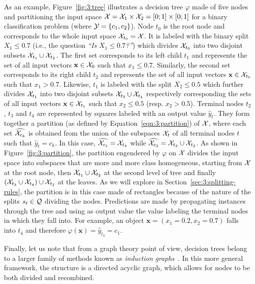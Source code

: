 As an example, Figure~\ref{fig:3:tree} illustrates a decision tree $\varphi$
made of five nodes and partitioning the input space ${\cal X} = {\cal X}_1
\times {\cal X}_2 = [0;1] \times [0; 1]$ for a binary classification problem
(where ${\cal Y}=\{ c_1, c_2 \}$). Node $t_0$ is the root node and corresponds
to the whole input space ${\cal X}_{t_0} = {\cal X}$. It is labeled with the binary
split $X_1 \leq 0.7$ (i.e., the question \textit{``Is $X_1 \leq 0.7$?''}) which divides ${\cal X}_{t_0}$ into two disjoint subsets
${\cal X}_{t_1} \cup {\cal X}_{t_2}$. The first set corresponds to its left
child $t_1$ and represents the set of all input vectors $\mathbf{x} \in {\cal
X}_0$ such that $x_1 \leq 0.7$. Similarly, the second set corresponds to its
right child $t_2$ and represents the set of all input vectors $\mathbf{x} \in
{\cal X}_{t_0}$ such that $x_1 > 0.7$. Likewise, $t_1$ is labeled with the
split $X_2 \leq 0.5$ which further divides ${\cal X}_{t_1}$ into two disjoint
subsets ${\cal X}_{t_3} \cup {\cal X}_{t_4}$ respectively corresponding the
sets of all input vectors $\mathbf{x} \in {\cal X}_{t_1}$ such that $x_2 \leq
0.5$ (resp. $x_2 > 0.5$). Terminal nodes $t_2$, $t_3$ and $t_4$ are represented
by squares labeled with an output value $\widehat{y}_t$. They form together a
partition (as defined by Equation~\ref{eqn:3:partition}) of ${\cal X}$, where
each set $\widehat{{\cal X}_{c_k}}$ is obtained from the union of the subspaces
${\cal X}_t$ of all terminal nodes $t$ such that $\widehat{y}_t = c_k$. In this
case, $\widehat{{\cal X}_{c_1}} = {\cal X}_{t_4}$ while $\widehat{{\cal
X}_{c_2}} = {\cal X}_{t_2} \cup {\cal X}_{t_3}$. As shown in
Figure~\ref{fig:3:partition}, the partition engendered by  $\varphi$ on ${\cal
X}$ divides the input space into subspaces that are more and more class
homogeneous, starting from ${\cal X}$ at the root node,  then ${\cal X}_{t_1}
\cup {\cal X}_{t_2}$ at the second level of tree and finally $({\cal X}_{t_3}
\cup {\cal X}_{t_4})\cup {\cal X}_{t_2}$ at the leaves.  As we will explore in
Section~\ref{sec:3:splitting-rules}, the partition is in this case made of
rectangles because of the nature of the splits $s_t \in {\cal Q}$ dividing the nodes.
Predictions are made by propagating instances through the tree and using as
output value the value labeling the terminal nodes in which they fall
into. For example, an object $\mathbf{x}=(x_1=0.2, x_2=0.7)$ falls into $t_4$
and therefore $\varphi(\mathbf{x}) = \widehat{y}_{t_4} = c_1$.

Finally, let us note that from a graph theory point of view, decision trees
belong to a larger family of methods known as \textit{induction
graphs}~\citep{zighed:2000}. In this more general framework, the structure is a
directed acyclic graph, which allows for nodes to be both divided and
recombined.


